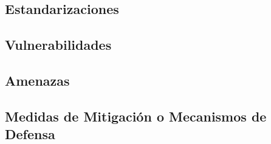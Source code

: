 \subsection{Estandarizaciones}
\label{chap3:Standars}

\subsection{Vulnerabilidades}
\label{chap3:vuln}

\subsection{Amenazas}
\label{chap3:threats}

\subsection{Medidas de Mitigación o Mecanismos de Defensa}
\label{chap3:mitig}

